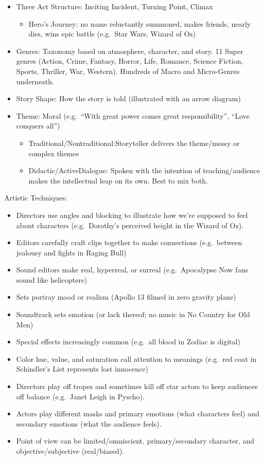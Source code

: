 \documentclass[
]{article}
\providecommand{\tightlist}{%
  \setlength{\itemsep}{0pt}\setlength{\parskip}{0pt}}
\begin{document}
\begin{itemize}
\item
  Three Act Structure: Inciting Incident, Turning Point, Climax

  \begin{itemize}
  \tightlist
  \item
    Hero's Journey: no name reluctantly summoned, makes friends, nearly
    dies, wins epic battle (e.g.~Star Wars, Wizard of Oz)
  \end{itemize}
\item
  Genres: Taxonomy based on atmosphere, character, and story. 11 Super
  genres (Action, Crime, Fantasy, Horror, Life, Romance, Science
  Fiction, Sports, Thriller, War, Western). Hundreds of Macro and
  Micro-Genres underneath.
\item
  Story Shape: How the story is told (illustrated with an arrow diagram)
\item
  Theme: Moral (e.g.~``With great power comes great responsibility'',
  ``Love conquers all'')

  \begin{itemize}
  \item
    Traditional/Nontraditional:Storyteller delivers the theme/messy or
    complex themes
  \item
    Didactic/ActiveDialogue: Spoken with the intention of
    teaching/audience makes the intellectual leap on its own. Best to
    mix both.
  \end{itemize}
\end{itemize}

Artistic Techniques:

\begin{itemize}
\item
  Directors use angles and blocking to illustrate how we're supposed to
  feel about characters (e.g.~Dorothy's perceived height in the Wizard
  of Oz).
\item
  Editors carefully craft clips together to make connections
  (e.g.~between jealousy and fights in Raging Bull)
\item
  Sound editors make real, hyperreal, or surreal (e.g.~Apocalypse Now
  fans sound like helicopters)
\item
  Sets portray mood or realism (Apollo 13 filmed in zero gravity plane)
\item
  Soundtrack sets emotion (or lack thereof; no music in No Country for
  Old Men)
\item
  Special effects increasingly common (e.g.~all blood in Zodiac is
  digital)
\item
  Color hue, value, and saturation call attention to meanings (e.g.~red
  coat in Schindler's List represents lost innocence)
\item
  Directors play off tropes and sometimes kill off star actors to keep
  audiences off balance (e.g.~Janet Leigh in Pyscho).
\item
  Actors play different masks and primary emotions (what characters
  feel) and secondary emotions (what the audience feels).
\item
  Point of view can be limited/omniscient, primary/secondary character,
  and objective/subjective (real/biased).
\end{itemize}
\end{document}
